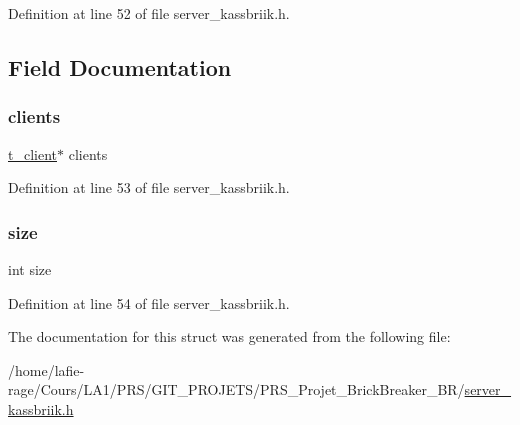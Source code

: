 Definition at line 52 of file server\+\_\+kassbriik.\+h.



\subsection{Field Documentation}
\mbox{\label{structclients__list_aebf714cf96a3647f8caa5c43c5af8ea7}} 
\subsubsection{\texorpdfstring{clients}{clients}}
{\footnotesize\ttfamily \hyperlink{structt__client}{t\+\_\+client}$\ast$ clients}



Definition at line 53 of file server\+\_\+kassbriik.\+h.

\mbox{\label{structclients__list_a439227feff9d7f55384e8780cfc2eb82}} 
\subsubsection{\texorpdfstring{size}{size}}
{\footnotesize\ttfamily int size}



Definition at line 54 of file server\+\_\+kassbriik.\+h.



The documentation for this struct was generated from the following file\+:\begin{DoxyCompactItemize}
\item 
/home/lafie-\/rage/\+Cours/\+L\+A1/\+P\+R\+S/\+G\+I\+T\+\_\+\+P\+R\+O\+J\+E\+T\+S/\+P\+R\+S\+\_\+\+Projet\+\_\+\+Brick\+Breaker\+\_\+\+B\+R/\hyperlink{server__kassbriik_8h}{server\+\_\+kassbriik.\+h}\end{DoxyCompactItemize}
